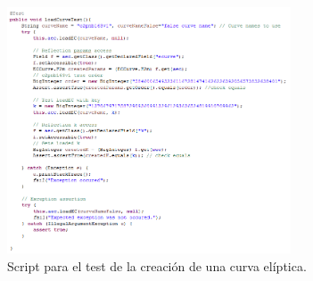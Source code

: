 \documentclass[../PFC.tex]{subfiles}
\begin{document}
\begin{figure}[H]
  \centering
  \includegraphics[width=0.75\textwidth]{./img/loadCurveTest}
  \caption{Script para el test de la creación de una curva elíptica.}
  \label{img:loadCurveTest}
\end{figure}
\end{document}
